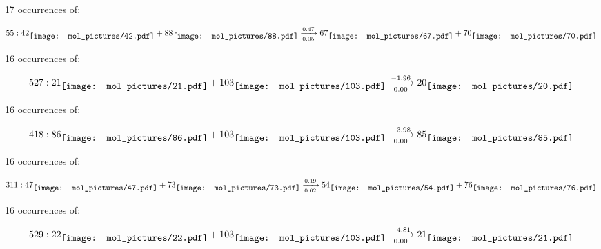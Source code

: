 \documentclass{article}
\begin{document}
\vspace{1cm}


17 occurrences of:

$$
55:  
42
\raisebox{-.5\height}{\texttt{[image: mol\_pictures/42.pdf]}}
+
88
\raisebox{-.5\height}{\texttt{[image: mol\_pictures/88.pdf]}}
\xrightarrow[0.05]{0.47}
67
\raisebox{-.5\height}{\texttt{[image: mol\_pictures/67.pdf]}}
+
70
\raisebox{-.5\height}{\texttt{[image: mol\_pictures/70.pdf]}}
$$



\vspace{1cm}


16 occurrences of:

$$
527:  
21
\raisebox{-.5\height}{\texttt{[image: mol\_pictures/21.pdf]}}
+
103
\raisebox{-.5\height}{\texttt{[image: mol\_pictures/103.pdf]}}
\xrightarrow[0.00]{-1.96}
20
\raisebox{-.5\height}{\texttt{[image: mol\_pictures/20.pdf]}}
$$



\vspace{1cm}


16 occurrences of:

$$
418:  
86
\raisebox{-.5\height}{\texttt{[image: mol\_pictures/86.pdf]}}
+
103
\raisebox{-.5\height}{\texttt{[image: mol\_pictures/103.pdf]}}
\xrightarrow[0.00]{-3.98}
85
\raisebox{-.5\height}{\texttt{[image: mol\_pictures/85.pdf]}}
$$



\vspace{1cm}


16 occurrences of:

$$
311:  
47
\raisebox{-.5\height}{\texttt{[image: mol\_pictures/47.pdf]}}
+
73
\raisebox{-.5\height}{\texttt{[image: mol\_pictures/73.pdf]}}
\xrightarrow[0.02]{0.19}
54
\raisebox{-.5\height}{\texttt{[image: mol\_pictures/54.pdf]}}
+
76
\raisebox{-.5\height}{\texttt{[image: mol\_pictures/76.pdf]}}
$$



\vspace{1cm}


16 occurrences of:

$$
529:  
22
\raisebox{-.5\height}{\texttt{[image: mol\_pictures/22.pdf]}}
+
103
\raisebox{-.5\height}{\texttt{[image: mol\_pictures/103.pdf]}}
\xrightarrow[0.00]{-4.81}
21
\raisebox{-.5\height}{\texttt{[image: mol\_pictures/21.pdf]}}
$$
\end{document}
